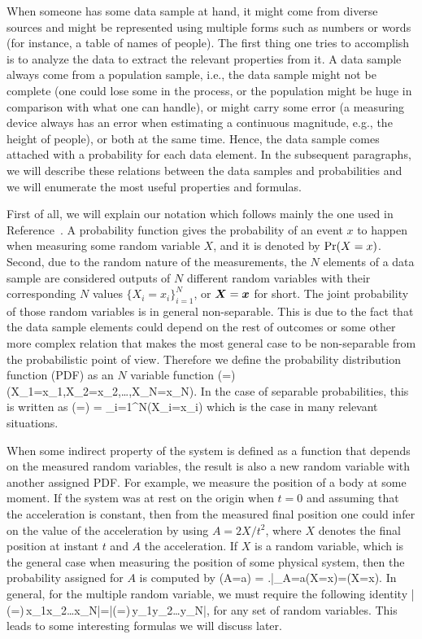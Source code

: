 When someone has some data sample at hand, it might come from diverse sources and might be represented using multiple forms such as numbers or words (for instance, a table of names of people).
The first thing one tries to accomplish is to analyze the data to extract the relevant properties from it.
A data sample always come from a population sample, i.e., the data sample might not be complete (one could lose some in the process, or the population might be huge in comparison with what one can handle), or might carry some error (a measuring device always has an error when estimating a continuous magnitude, e.g., the height of people), or both at the same time.
Hence, the data sample comes attached with a probability for each data element.
In the subsequent paragraphs, we will describe these relations between the data samples and probabilities and we will enumerate the most useful properties and formulas.

First of all, we will explain our notation which follows mainly the one used in Reference~\citep{Riley1998}.
A probability function gives the probability of an event $x$ to happen when measuring some random variable $X$, and it is denoted by $\text{Pr}(X=x)$.
Second, due to the random nature of the measurements, the $N$ elements of a data sample are considered outputs of $N$ different random variables with their corresponding $N$ values $\{X_i=x_i\}_{i=1}^N$, or $\boldsymbol{X}=\boldsymbol{x}$ for short.
The joint probability of those random variables is in general non-separable.
This is due to the fact that the data sample elements could depend on the rest of outcomes or some other more complex relation that makes the most general case to be non-separable from the probabilistic point of view.
Therefore we define the probability distribution function (PDF) as an $N$ variable function
\be
  \prob(=) \equiv \prob(X_1=x_1,X_2=x_2,\dots,X_N=x_N).
\ee
In the case of separable probabilities, this is written as
\be
  \label{eq:bg-separable-likelyhood}
  \prob(=) = \prod_{i=1}^N\prob(X_i=x_i)
\ee
which is the case in many relevant situations.

When some indirect property of the system is defined as a function that depends on the measured random variables, the result is also a new random variable with another assigned PDF.
For example, we measure the position of a body at some moment.
If the system was at rest on the origin when $t=0$ and assuming that the acceleration is constant, then from the measured final position one could infer on the value of the acceleration by using $A=2X/t^2$, where $X$ denotes the final position at instant $t$ and $A$ the acceleration.
If $X$ is a random variable, which is the general case when measuring the position of some physical system, then the probability assigned for $A$ is computed by
\be
  \prob(A=a) = \left.\right|_{A=a}\prob(X=x)=\prob(X=x).
\ee
In general, for the multiple random variable, we must require the following identity
\be
  |\prob(=)\,x_1x_2\dots{}x_N|=|\prob(=)\,y_1y_2\dots{}y_N|,
\ee
for any set of random variables.
This leads to some interesting formulas we will discuss later.

